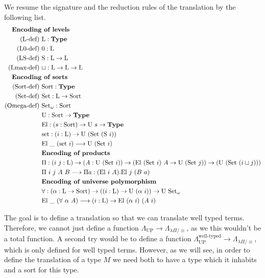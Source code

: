 \documentclass[]{StandardTemplate}
\begin{document}
We resume the signature and the reduction rules of the translation by the following list.
\begin{align*}
  \text{\textbf{Encoding}}&\text{\textbf{ of levels}}\\
  \text{(L-def) }&\text{L} : \textbf{Type} \\
  \text{(L0-def) }&0 : \text{L} \\
  \text{(LS-def) }&\text{S} : \text{L} \to \text{L} \\
  \text{(Lmax-def) }&\sqcup : \text{L} \to \text{L} \to \text{L}\\
  \text{\textbf{Encoding}}&\text{\textbf{ of sorts}}\\  
  \text{(Sort-def) }&\text{Sort} : \textbf{Type} \\
  \text{(Set-def) }&\text{Set} : \text{L} \to \text{Sort} \\
  \text{(Omega-def) }&\text{Set}_\omega : \text{Sort}\\
  &\text{U} : \text{Sort} \to \textbf{Type}\\
  &\text{El} : (s : \text{Sort}) \to \text{U}~s \to \textbf{Type}\\
  &\text{set} : (i : \text{L}) \to \text{U}~(\text{Set}~(\text{S}~i))\\
  &\text{El}~\_~(\text{set}~i) \longrightarrow \text{U}~(\text{Set}~i)\\
  &\text{\textbf{Encoding of products}}\\  
  &\Pi : (i~j : \text{L}) \to (A : \text{U}~(\text{Set}~i)) \to (\text{El}~(\text{Set}~i)~A \to \text{U}~(\text{Set}~j)) \to (\text{U}~(\text{Set}~(i \sqcup j)))\\
  &\Pi~i~j~A~B \longrightarrow \Pi a : (\text{El}~i~A). \text{El}~j~(B~a)\\
                          &\text{\textbf{Encoding of universe polymorphism}}\\
                          &\forall : (\alpha : \text{L} \to \text{Sort}) \to ((i : \text{L}) \to \text{U}~(\alpha~i))\to \text{U}~\text{Set}_\omega\\
&\text{El}~\_~(\forall~\alpha~A) \longrightarrow (i : \text{L}) \to \text{El}~(\alpha~i)~(A~i)
\end{align*}

The goal is to define a translation so that we can translate well typed terms. Therefore, we cannot just define a function $ \Lambda_{\text{UP}}\to \Lambda_{\lambda \Pi / \equiv}  $, as we this wouldn't be a total function. A second try would be to define a function $ \Lambda_{\text{UP}}^\text{well-typed} \to \Lambda_{\lambda \Pi / \equiv} $, which is only defined for well typed terms. However, as we will see, in order to define the translation of a type $ M $ we need both to have a type which it inhabits and a sort for this type.
\end{document}
